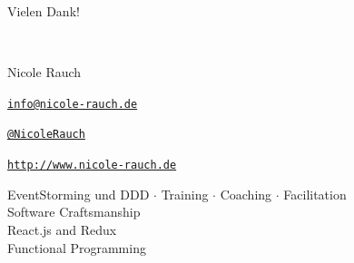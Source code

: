 \begin{frame}{Vielen Dank!}
        
        ~\\[1em]
        \begin{block}{Nicole Rauch}
        \begin{description}[Twitterxx]
                \item[E-Mail]  \href{mailto:info@nicole-rauch.de}{\texttt{info@nicole-rauch.de}}
                \item[Twitter] \href{http://twitter.com/NicoleRauch}{\texttt{@NicoleRauch}}
                \item[Web] \href{http://www.nicole-rauch.de}{\texttt{http://www.nicole-rauch.de}}
        \end{description}
        \end{block}
                
        \begin{center}
        EventStorming und DDD $\cdot$ Training $\cdot$ Coaching $\cdot$ Facilitation \\[1em]

	Software Craftsmanship \\ 
	React.js and Redux  \\
	Functional Programming
\end{center}  

\end{frame}

